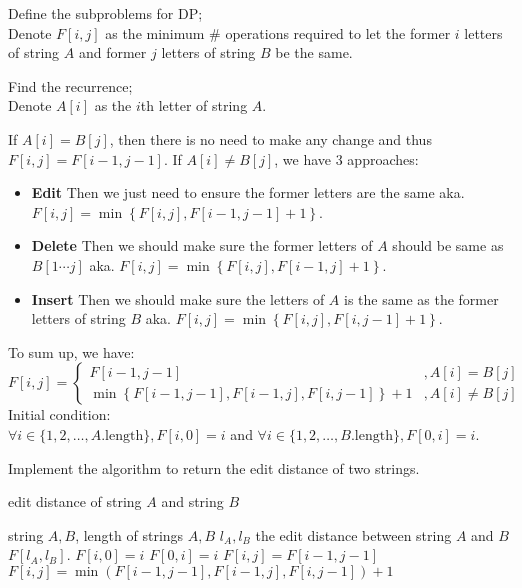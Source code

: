\documentclass[11pt]{article}
\begin{document}
\begin{qparts}
\item Define the subproblems for DP;\\
Denote $F[i,j]$ as the minimum \# operations required to let the former $i$ letters of string $A$ and former $j$ letters of string $B$ be the same.

\item Find the recurrence;\\
Denote $A[i]$ as the $i$th letter of string $A$.

If $A[i]=B[j]$, then there is no need to make any change and thus $F[i,j]=F[i-1,j-1]$.
If $A[i]\neq B[j]$, we have 3 approaches:
\begin{itemize}
    
    \item \textbf{Edit} Then we just need to ensure the former letters are the same aka. $F[i,j]=\min \left\{ F[i,j],F[i-1,j-1]+1 \right\} $.
    \item \textbf{Delete} Then we should make sure the former letters of $A$ should be same as $B[1\cdots j]$ aka. $F[i,j]=\min \left\{ F[i,j],F[i-1,j]+1 \right\} $.
    \item \textbf{Insert} Then we should make sure the letters of $A$ is the same as the former letters of string $B$ aka. $F[i,j]=\min \left\{ F[i,j],F[i,j-1]+1 \right\} $.
\end{itemize}
To sum up, we have:
$$
F[i,j]=
\begin{cases}
    F[i-1,j-1]&,A[i]=B[j]\\
    \min \left\{ F[i-1,j-1],F[i-1,j],F[i,j-1] \right\}+1&,A[i]\neq B[j] 
\end{cases}
$$
Initial condition: \\
$\forall i \in \{ 1,2, \ldots ,A.\text{length}\},F[i,0]=i$ and $\forall i \in \{ 1,2, \ldots ,B.\text{length} \},F[0,i]=i$.

\item Implement the algorithm to return the edit distance of two strings.
\begin{algorithm}
    \caption{edit distance of string $A$ and string $B$}
    \begin{algorithmic}
        \Require string $A,B$, length of strings $A,B$ $l_{A},l_{B}$
        \Ensure the edit distance between string $A$ and $B$ $F[l_{A},l_{B}]$.
        \State $F[i,0]=i$
        \EndFor
        \State $F[0,i]=i$
        \EndFor
        \State $F[i,j]=F[i-1,j-1]$
        \Else
        \State $F[i,j]=\min \left( F[i-1,j-1],F[i-1,j],F[i,j-1] \right) +1$
        \EndIf
        \EndFor
        \EndFor
    \end{algorithmic}
\end{algorithm}

\end{qparts}
\end{document}
